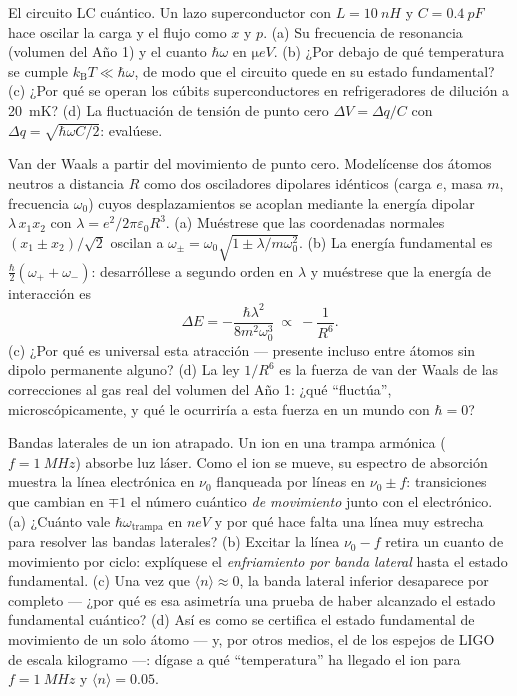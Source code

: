 \begin{exercise}[$\star\star$]\label{exo:b3:harmonic-oscillator:9}
El circuito LC cuántico. Un lazo superconductor con $L =
\qty{10}{nH}$ y $C = \qty{0.4}{pF}$ hace oscilar la carga y el flujo
como $x$ y $p$. (a) Su frecuencia de resonancia (volumen del Año 1) y
el cuanto $\hbar\omega$ en $\unit{\micro eV}$. (b) ¿Por debajo de qué
temperatura se cumple $k_{\text{B}}T \ll \hbar\omega$, de modo que el
circuito quede en su estado fundamental? (c) ¿Por qué se operan los cúbits
superconductores en refrigeradores de dilución a \qty{20}{mK}? (d) La
fluctuación de tensión de punto cero $\Delta V = \Delta q/C$ con $\Delta q =
\sqrt{\hbar\omega C/2}$: evalúese.
\end{exercise}

\begin{exercise}[$\star\star\star$]\label{exo:b3:harmonic-oscillator:10}
Van der Waals a partir del movimiento de punto cero. Modelícense dos átomos
neutros a distancia $R$ como dos osciladores dipolares idénticos (carga $e$,
masa $m$, frecuencia $\omega_0$) cuyos desplazamientos se acoplan mediante
la energía dipolar $\lambda\,x_1x_2$ con $\lambda = e^2/2\pi\varepsilon_0R^3$.
(a) Muéstrese que las coordenadas normales $(x_1 \pm x_2)/\sqrt2$ oscilan a
$\omega_\pm = \omega_0\sqrt{1 \pm \lambda/m\omega_0^2}$. (b) La
energía fundamental es $\tfrac\hbar2(\omega_+ + \omega_-)$: desarróllese a
segundo orden en $\lambda$ y muéstrese que la energía de interacción es
\[
\Delta E = -\frac{\hbar\lambda^2}{8m^2\omega_0^3}
\ \propto\ -\frac{1}{R^6} .
\]
(c) ¿Por qué es universal esta atracción --- presente incluso entre átomos
sin dipolo permanente alguno? (d) La ley $1/R^6$ es la fuerza de van der
Waals de las correcciones al gas real del volumen del Año 1: ¿qué
``fluctúa'', microscópicamente, y qué le ocurriría a esta fuerza en un mundo
con $\hbar = 0$?
\end{exercise}

\begin{exercise}[$\star\star\star$]\label{exo:b3:harmonic-oscillator:11}
Bandas laterales de un ion atrapado. Un ion en una trampa armónica ($f =
\qty{1}{MHz}$) absorbe luz láser. Como el ion se mueve, su espectro de
absorción muestra la línea electrónica en $\nu_0$ flanqueada por
líneas en $\nu_0 \pm f$: transiciones que cambian en $\mp1$ el número
cuántico \emph{de movimiento} junto con el electrónico. (a) ¿Cuánto vale
$\hbar\omega_{\text{trampa}}$ en $\unit{neV}$ y por qué hace falta una línea
muy estrecha para resolver las bandas laterales? (b) Excitar la línea
$\nu_0 - f$ retira un cuanto de movimiento por ciclo: explíquese el
\emph{enfriamiento por banda lateral} hasta el estado fundamental. (c) Una
vez que $\langle n\rangle \approx
0$, la banda lateral inferior desaparece por completo --- ¿por qué es esa asimetría una prueba de haber alcanzado el
estado fundamental cuántico? (d) Así es como se certifica el estado
fundamental de movimiento de un solo átomo --- y, por otros medios, el de
los espejos de LIGO de escala kilogramo ---: dígase a qué ``temperatura'' ha
llegado el ion para $f = \qty{1}{MHz}$ y $\langle n\rangle = 0.05$.
\end{exercise}

